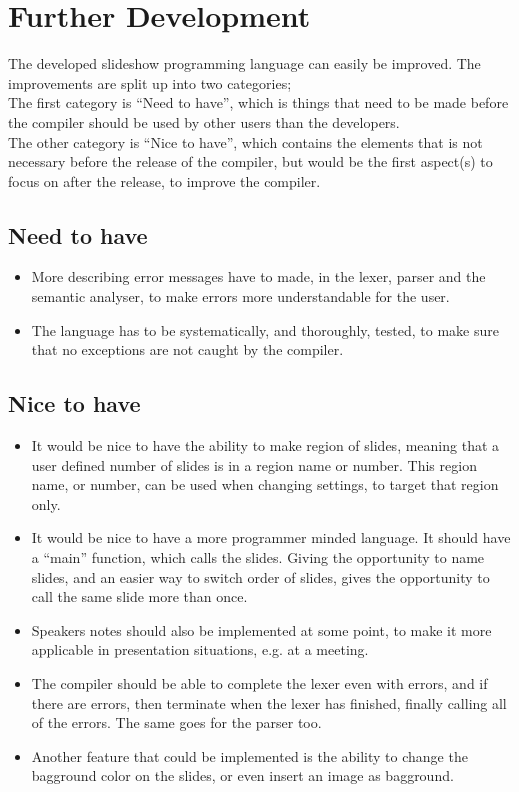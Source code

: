 \chapter{Further Development}
\label{sec:furtherdev}
The developed slideshow programming language can easily be improved. The improvements are split up into two categories; \\
The first category is ``Need to have'', which is things that need to be made before the compiler should be used by other users than the developers. \\
The other category is ``Nice to have'', which contains the elements that is not necessary before the release of the compiler, but would be the first aspect(s) to focus on after the release, to improve the compiler.

\section{Need to have}
\begin{itemize}
	\item More describing error messages have to made, in the lexer, parser and the semantic analyser, to make errors more understandable for the user.
	\item The language has to be systematically, and thoroughly, tested, to make sure that no exceptions are not caught by the compiler.
\end{itemize}

\section{Nice to have}
\begin{itemize}
	\item It would be nice to have the ability to make region of slides, meaning that a user defined number of slides is in a region name or number. This region name, or number, can be used when changing settings, to target that region only.
	\item It would be nice to have a more programmer minded language. It should have a ``main'' function, which calls the slides. Giving the opportunity to name slides, and an easier way to switch order of slides, gives the opportunity to call the same slide more than once.
	\item Speakers notes should also be implemented at some point, to make it more applicable in presentation situations, e.g. at a meeting.
	\item The compiler should be able to complete the lexer even with errors, and if there are errors, then terminate when the lexer has finished, finally calling all of the errors. The same goes for the parser too.
	\item Another feature that could be implemented is the ability to change the bagground color on the slides, or even insert an image as bagground.
\end{itemize}